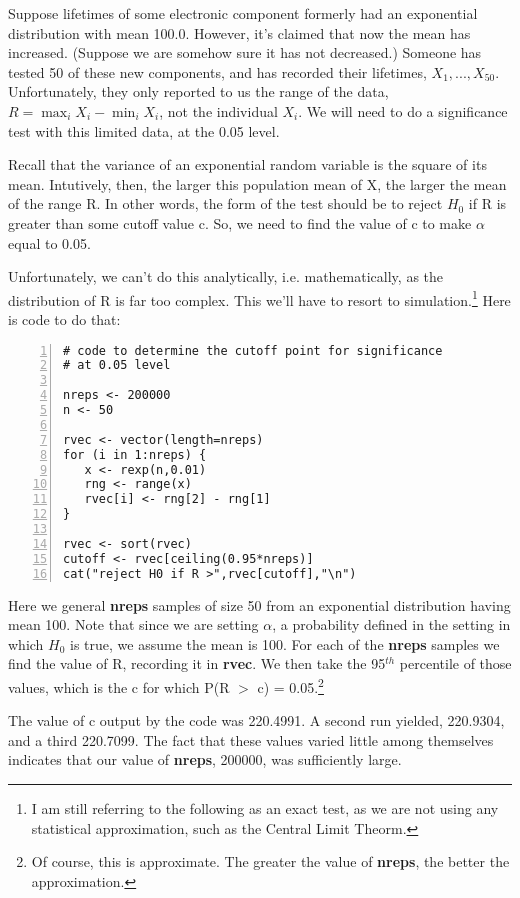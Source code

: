 Suppose lifetimes of some electronic component formerly had an
exponential distribution with mean 100.0.  However, it's claimed that
now the mean has increased.  (Suppose we are somehow sure it has not
decreased.)  Someone has tested 50 of these new components, and has
recorded their lifetimes, $X_1,...,X_{50}$.  Unfortunately, they only
reported to us the range of the data, $R = \max_i X_i - \min_i X_i$, not
the individual $X_i$.  We will need to do a significance test with this
limited data, at the 0.05 level.  

Recall that the variance of an exponential random variable is the square
of its mean.  Intutively, then, the larger this population mean of X,
the larger the mean of the range R.  In other words, the form of the
test should be to reject $H_0$ if R is greater than some cutoff value c.
So, we need to find the value of c to make $\alpha$ equal to 0.05.

Unfortunately, we can't do this analytically, i.e. mathematically, as
the distribution of R is far too complex.  This we'll have to resort to
simulation.\footnote{I am still referring to the following as an exact
test, as we are not using any statistical approximation, such as the
Central Limit Theorm.}  Here is code to do that:

\begin{lstlisting}[numbers=left]
# code to determine the cutoff point for significance 
# at 0.05 level

nreps <- 200000
n <- 50

rvec <- vector(length=nreps)
for (i in 1:nreps) {
   x <- rexp(n,0.01)
   rng <- range(x)
   rvec[i] <- rng[2] - rng[1]
}

rvec <- sort(rvec)
cutoff <- rvec[ceiling(0.95*nreps)]
cat("reject H0 if R >",rvec[cutoff],"\n")
\end{lstlisting}

Here we general {\bf nreps} samples of size 50 from an exponential
distribution having mean 100.  Note that since we are setting $\alpha$,
a probability defined in the setting in which $H_0$ is true, we assume
the mean is 100.  For each of the {\bf nreps} samples we find the value
of R, recording it in {\bf rvec}.  We then take the 95$^{th}$ percentile
of those values, which is the c for which P(R $>$ c) = 0.05.\footnote{Of
course, this is approximate.  The greater the value of {\bf nreps}, the
better the approximation.}

The value of c output by the code was 220.4991.  A second run yielded,
220.9304, and a third 220.7099.  The fact that these values varied little
among themselves indicates that our value of {\bf nreps}, 200000, was
sufficiently large.

